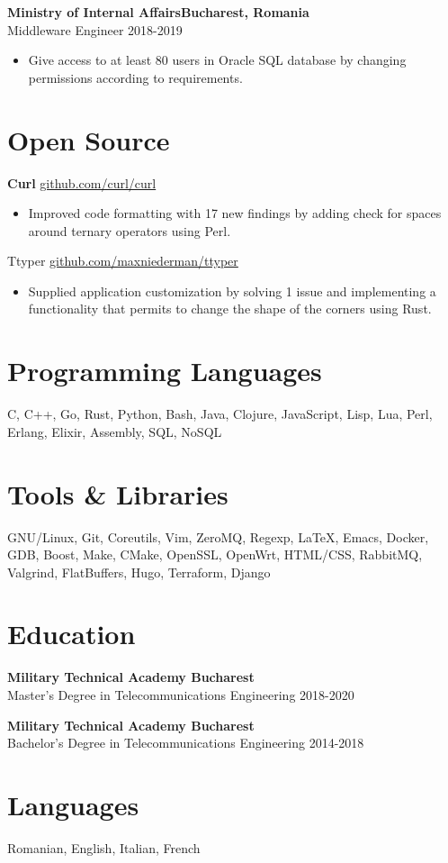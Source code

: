 \documentclass[a4paper,12pt]{article}
\begin{document}
\textbf{Ministry of Internal Affairs\hfill Bucharest, Romania}\\
Middleware Engineer \hfill 2018-2019 
\vspace{-3mm}
\begin{itemize}[noitemsep, leftmargin=4mm]
\item Give access to at least 80 users in Oracle SQL database by changing permissions according to requirements.
\end{itemize}

\section{Open Source}
\textbf{Curl} \hfill \href{https://github.com/curl/curl}{github.com/curl/curl}
\vspace{-3mm}
\begin{itemize}[noitemsep, leftmargin=4mm]
\item Improved code formatting with 17 new findings by adding check for spaces around ternary operators using Perl.
\end{itemize}

Ttyper \hfill \href{https://github.com/maxniederman/ttype}{github.com/maxniederman/ttyper}
\vspace{-3mm}
\begin{itemize}[noitemsep, leftmargin=4mm]
\item Supplied application customization by solving 1 issue and implementing a functionality that permits to change the shape of the corners using Rust.
\end{itemize}

  
\section{Programming Languages}
C, C++, Go, Rust, Python, Bash, Java, Clojure, JavaScript, 
Lisp, Lua, Perl, Erlang, Elixir, Assembly, SQL, NoSQL

\section{Tools \& Libraries}
GNU/Linux, Git, Coreutils, Vim, ZeroMQ, Regexp, \LaTeX, 
Emacs, Docker, GDB, Boost, Make, CMake, OpenSSL, OpenWrt, HTML/CSS, 
RabbitMQ, Valgrind, FlatBuffers, Hugo, Terraform, Django 

\section{Education}
\textbf{Military Technical Academy \hfill Bucharest}\\
Master's Degree in Telecommunications Engineering \hfill 2018-2020

\textbf{Military Technical Academy \hfill Bucharest}\\
Bachelor's Degree in Telecommunications Engineering \hfill 2014-2018

\section{Languages}
Romanian, English, Italian, French
\end{document}
